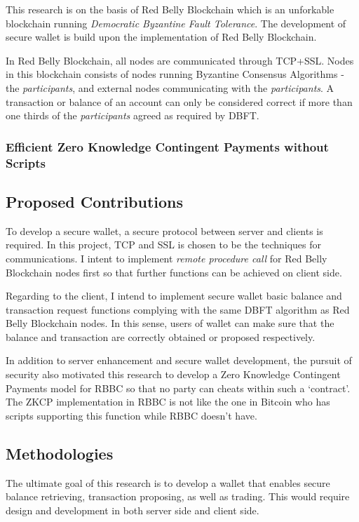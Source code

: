 \documentclass[12pt]{article}
\begin{document}
This research is on the basis of Red Belly Blockchain which is an unforkable blockchain running \textit{Democratic Byzantine Fault Tolerance}. The development of secure wallet is build upon the implementation of Red Belly Blockchain.

In Red Belly Blockchain, all nodes are communicated through TCP+SSL. Nodes in this blockchain consists of nodes running Byzantine Consensus Algorithms - the \textit{participants}, and external nodes communicating with the \textit{participants}. A transaction or balance of an account can only be considered correct if more than one thirds of the \textit{participants} agreed as required by DBFT.

\subsubsection{Efficient Zero Knowledge Contingent Payments without Scripts}

\subsection{Proposed Contributions}

To develop a secure wallet, a secure protocol between server and clients is required. In this project, TCP and SSL is chosen to be the techniques for communications. I intent to implement \textit{remote procedure call} for Red Belly Blockchain nodes first so that further functions can be achieved on client side. 

Regarding to the client, I intend to implement secure wallet basic balance and transaction request functions complying with the same DBFT algorithm as Red Belly Blockchain nodes. In this sense, users of wallet can make sure that the balance and transaction are correctly obtained or proposed respectively.

In addition to server enhancement and secure wallet development, the pursuit of security also motivated this research to develop a Zero Knowledge Contingent Payments model for RBBC so that no party can cheats within such a `contract'. The ZKCP implementation in RBBC is not like the one in Bitcoin who has scripts supporting this function while RBBC doesn't have.

\subsection{Methodologies}

The ultimate goal of this research is to develop a wallet that enables secure balance retrieving, transaction proposing, as well as trading. This would require design and development in both server side and client side.
\end{document}
